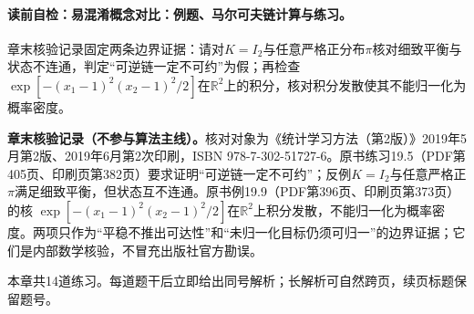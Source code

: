 \label{struct:V5-C03-CH34}

\paragraph{读前自检：易混淆概念对比：例题、马尔可夫链计算与练习。}章末核验记录固定两条边界证据：请对$K=I_2$与任意严格正分布$\pi$核对细致平衡与状态不连通，判定“可逆链一定不可约”为假；再检查$\exp[-(x_1-1)^2(x_2-1)^2/2]$在$\mathbb R^2$上的积分，核对积分发散使其不能归一化为概率密度。\par

\begin{comparisonbox}
\textbf{章末核验记录（不参与算法主线）。}核对对象为《统计学习方法（第2版）》2019年5月第2版、2019年6月第2次印刷，ISBN 978-7-302-51727-6。原书练习19.5（PDF第405页、印刷页第382页）要求证明“可逆链一定不可约”；反例$K=I_2$与任意严格正$\pi$满足细致平衡，但状态互不连通。原书例19.9（PDF第396页、印刷页第373页）的核
$\exp[-(x_1-1)^2(x_2-1)^2/2]$在$\mathbb R^2$上积分发散，不能归一化为概率密度。两项只作为“平稳不推出可达性”和“未归一化目标仍须可归一”的边界证据；它们是内部数学核验，不冒充出版社官方勘误。
\end{comparisonbox}

\begin{chapterexercisebox}
\label{struct:V5-C03-CH35}
本章共14道练习。每道题干后立即给出同号解析；长解析可自然跨页，续页标题保留题号。
\end{chapterexercisebox}

